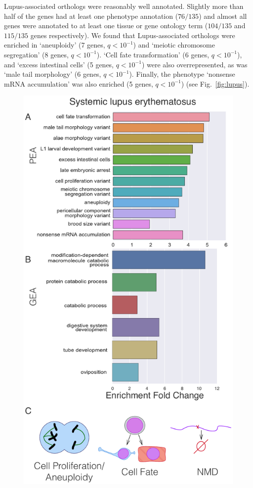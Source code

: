 \documentclass[10pt,letterpaper,twocolumn]{article}
\newcommand{\wlupus}{135}
\newcommand{\qval}[1]{\ensuremath{q<10^{-#1}}}
\begin{document}
Lupus-associated orthologs were reasonably well annotated. Slightly more than half
of the genes had at least one phenotype annotation ($76/\wlupus{}$) and almost
all genes were annotated to at least one tissue or gene ontology term
($104/\wlupus{}$ and $115/\wlupus$ genes respectively).
We found that Lupus-associated orthologs were enriched in `aneuploidy' (7 genes,
\qval{1}) and `meiotic chromosome segregation' (8 genes, \qval{1}). `Cell fate
transformation' (6 genes, \qval{1}), and `excess intestinal cells'
(5 genes, \qval{1}) were also overrepresented, as was `male tail morphology'
(6 genes, \qval{1}). Finally, the phenotype `nonsense mRNA accumulation' was also
enriched (5 genes, \qval{1}) (see Fig.~\ref{fig:lupus}).

\begin{figure}[htbp]
  \renewcommand{\familydefault}{\sfdefault}\normalfont{}
  \centering
  \includegraphics[width=\linewidth]{systemic-lupus.pdf}

\end{figure}
\end{document}
